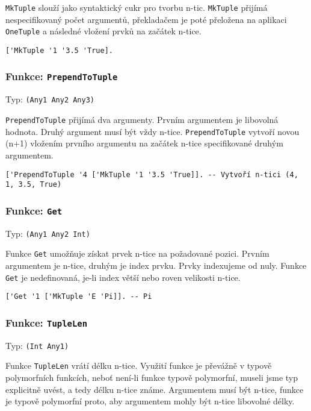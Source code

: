 \lstinline{MkTuple} slouží jako syntaktický cukr pro tvorbu n-tic. \lstinline{MkTuple} přijímá
nespecifikovaný počet argumentů, překladačem je poté přeložena na aplikaci \lstinline{OneTuple}
a následné vložení prvků na začátek n-tice.

\begin{lstlisting}[caption={Ukázka využití OneTuple}]
['MkTuple '1 '3.5 'True].
\end{lstlisting}

\subsubsection*{Funkce: \lstinline{PrependToTuple}}
Typ: \lstinline{(Any1 Any2 Any3)}

\lstinline{PrependToTuple} přijímá dva argumenty. Prvním argumentem je libovolná hodnota. Druhý
argument musí být vždy n-tice. \lstinline{PrependToTuple} vytvoří novou (n+1) vložením prvního
argumentu na začátek n-tice specifikované druhým argumentem.

\begin{lstlisting}[caption={Ukázka využití PrependToTuple}]
['PrependToTuple '4 ['MkTuple '1 '3.5 'True]]. -- Vytvoří n-tici (4, 1, 3.5, True)
\end{lstlisting}

\subsubsection*{Funkce: \lstinline{Get}}
Typ: \lstinline{(Any1 Any2 Int)}

Funkce \lstinline{Get} umožňuje získat prvek n-tice na požadované pozici. Prvním argumentem je
n-tice, druhým je index prvku. Prvky indexujeme od nuly. Funkce \lstinline{Get} je nedefinovaná,
je-li index větší nebo roven velikosti n-tice.

\begin{lstlisting}[caption={Ukázka využití Get}]
['Get '1 ['MkTuple 'E 'Pi]]. -- Pi
\end{lstlisting}

\subsubsection*{Funkce: \lstinline{TupleLen}}
Typ: \lstinline{(Int Any1)}

Funkce \lstinline{TupleLen} vrátí délku n-tice. Využití funkce je převážně v typově polymorfních
funkcích, neboť není-li funkce typově polymorfní, museli jsme typ explicitně uvést, a tedy délku
n-tice známe. Argumentem musí být n-tice, funkce je typově polymorfní proto, aby argumentem mohly
být n-tice libovolné délky.

